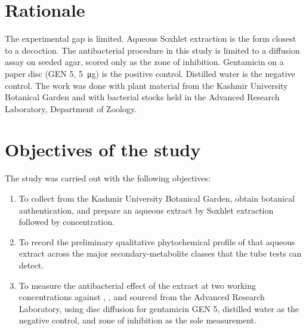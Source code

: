 \section{Rationale}

The experimental gap is limited. Aqueous Soxhlet extraction is the form closest to a decoction. The antibacterial procedure in this study is limited to a diffusion assay on seeded agar, scored only as the zone of inhibition. Gentamicin on a paper disc (GEN 5, \SI{5}{\micro\gram}) is the positive control. Distilled water is the negative control. The work was done with plant material from the Kashmir University Botanical Garden and with bacterial stocks held in the Advanced Research Laboratory, Department of Zoology.

\section{Objectives of the study}\label{sec:objectives}

The study was carried out with the following objectives:

\begin{enumerate}
  \item To collect  from the Kashmir University Botanical Garden, obtain botanical authentication, and prepare an aqueous extract by Soxhlet extraction followed by concentration.
  \item To record the preliminary qualitative phytochemical profile of that aqueous extract across the major secondary-metabolite classes that the tube tests can detect.
  \item To measure the \invitro{} antibacterial effect of the extract at two working concentrations against , , and  sourced from the Advanced Research Laboratory, using disc diffusion for gentamicin GEN 5, distilled water as the negative control, and zone of inhibition as the sole measurement.
\end{enumerate}

\FloatBarrier
